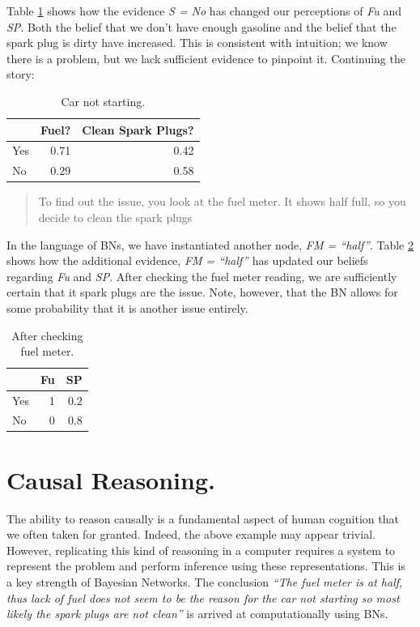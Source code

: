 \documentclass[twocol]{ametsoc}
\begin{document}
Table \ref{tab:tab4} shows how the evidence \emph{S = No} has changed
our perceptions of \emph{Fu} and \emph{SP}. Both the belief that we
don't have enough gasoline and the belief that the spark plug is dirty
have increased. This is consistent with intuition; we know there is a
problem, but we lack sufficient evidence to pinpoint it. Continuing the
story:

\begin{table}

\caption{\label{tab:tab4}Car not starting.}
\centering
\begin{tabular}[t]{l|r|r}
\hline
  & Fuel? & Clean Spark Plugs?\\
\hline
Yes & 0.71 & 0.42\\
\hline
No & 0.29 & 0.58\\
\hline
\end{tabular}
\end{table}

\begin{quote}
To find out the issue, you look at the fuel meter. It shows half full,
so you decide to clean the spark plugs
\end{quote}

In the language of BNs, we have instantiated another node, \emph{FM =
``half''}. Table \ref{tab:tab5} shows how the additional evidence,
\emph{FM = ``half''} has updated our beliefs regarding \emph{Fu} and
\emph{SP}. After checking the fuel meter reading, we are sufficiently
certain that it spark plugs are the issue. Note, however, that the BN
allows for some probability that it is another issue entirely.

\begin{table}

\caption{\label{tab:tab5}After checking fuel meter.}
\centering
\begin{tabular}[t]{l|r|r}
\hline
  & Fu & SP\\
\hline
Yes & 1 & 0.2\\
\hline
No & 0 & 0.8\\
\hline
\end{tabular}
\end{table}

\hypertarget{causal-reasoning.}{%
\section{Causal Reasoning.}\label{causal-reasoning.}}

The ability to reason causally is a fundamental aspect of human
cognition that we often taken for granted. Indeed, the above example may
appear trivial. However, replicating this kind of reasoning in a
computer requires a system to represent the problem and perform
inference using these representations. This is a key strength of
Bayesian Networks. The conclusion \emph{``The fuel meter is at half,
thus lack of fuel does not seem to be the reason for the car not
starting so most likely the spark plugs are not clean''} is arrived at
computationally using BNs.
\end{document}
